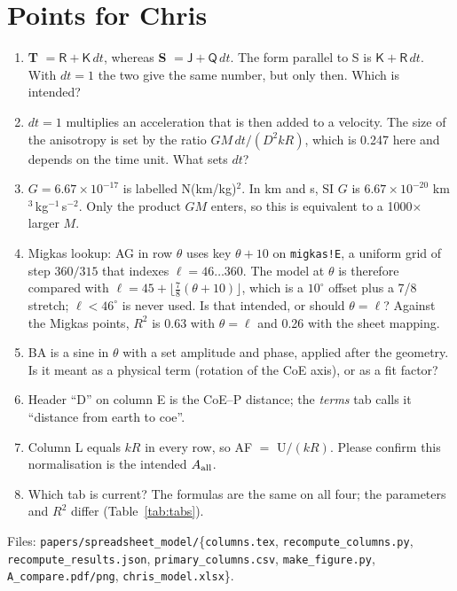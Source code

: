 \documentclass[10pt]{article}
\newcommand{\cl}[1]{\mathsf{#1}}
\begin{document}
\section{Points for Chris}
\begin{enumerate}\setlength{\itemsep}{1pt}
\item \textbf{T} $=\cl{R}+\cl{K}\,dt$, whereas \textbf{S} $=\cl{J}+\cl{Q}\,dt$. The form parallel to S is $\cl{K}+\cl{R}\,dt$. With $dt=1$ the two give the same number, but only then. Which is intended?
\item $dt=1$ multiplies an acceleration that is then added to a velocity. The size of the anisotropy is set by the ratio $GM\,dt/(D^2kR)$, which is 0.247 here and depends on the time unit. What sets $dt$?
\item $G=6.67\times10^{-17}$ is labelled N(km/kg)$^2$. In km and s, SI $G$ is $6.67\times10^{-20}$ km$^3$\,kg$^{-1}$\,s$^{-2}$. Only the product $GM$ enters, so this is equivalent to a 1000$\times$ larger $M$.
\item Migkas lookup: AG in row $\theta$ uses key $\theta+10$ on \texttt{migkas!E}, a uniform grid of step $360/315$ that indexes $\ell=46\ldots360$. The model at $\theta$ is therefore compared with $\ell=45+\lfloor\frac78(\theta+10)\rfloor$, which is a $10^\circ$ offset plus a 7/8 stretch; $\ell<46^\circ$ is never used. Is that intended, or should $\theta=\ell$? Against the Migkas points, $R^2$ is 0.63 with $\theta=\ell$ and 0.26 with the sheet mapping.
\item BA is a sine in $\theta$ with a set amplitude and phase, applied after the geometry. Is it meant as a physical term (rotation of the CoE axis), or as a fit factor?
\item Header ``D'' on column E is the CoE--P distance; the \emph{terms} tab calls it ``distance from earth to coe''.
\item Column L equals $kR$ in every row, so AF $=$ U$/(kR)$. Please confirm this normalisation is the intended $A_{\rm all}$.
\item Which tab is current? The formulas are the same on all four; the parameters and $R^2$ differ (Table~\ref{tab:tabs}).
\end{enumerate}

\sloppy\footnotesize Files: \texttt{papers/spreadsheet\_model/}\{\texttt{columns.tex}, \texttt{recompute\_columns.py}, \texttt{recompute\_results.json}, \texttt{primary\_columns.csv}, \texttt{make\_figure.py}, \texttt{A\_compare.pdf/png}, \texttt{chris\_model.xlsx}\}.
\end{document}
